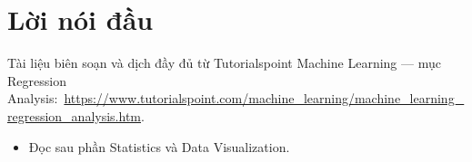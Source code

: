 \documentclass[12pt,a4paper]{article}
\newcommand{\tsurl}[1]{\url{#1}}
\begin{document}

\newpage
\tableofcontents
\newpage

\section*{Lời nói đầu}

\begin{ynghia}[title={Nguồn}]
Tài liệu biên soạn và dịch đầy đủ từ Tutorialspoint Machine Learning --- mục Regression Analysis:\ \tsurl{https://www.tutorialspoint.com/machine_learning/machine_learning_regression_analysis.htm}.
\end{ynghia}

\begin{phuongphap}[title={Cách dùng}]
\begin{itemize}
  \item Đọc sau phần Statistics và Data Visualization.
\end{itemize}
\end{phuongphap}

\newpage






\end{document}
